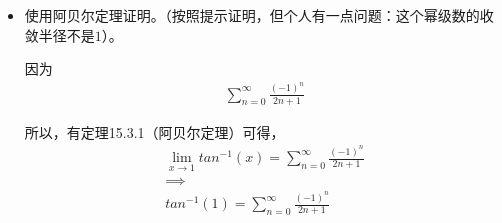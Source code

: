 \documentclass{article}
\begin{document}
\begin{itemize}
  \item 使用阿贝尔定理证明。（按照提示证明，但个人有一点问题：这个幂级数的收敛半径不是$1$）。

        因为
        \begin{align*}
          \sum \limits_{n = 0}^{\infty} \frac{(-1)^n}{2n + 1}
        \end{align*}

        所以，有定理15.3.1（阿贝尔定理）可得，
        \begin{align*}
          \lim\limits_{x \to 1} tan^{-1}(x) = \sum \limits_{n = 0}^{\infty} \frac{(-1)^n}{2n + 1} \\
          \implies                                                                                \\
          tan^{-1} (1) = \sum \limits_{n = 0}^{\infty} \frac{(-1)^n}{2n + 1}
        \end{align*}





\end{itemize}
\end{document}
